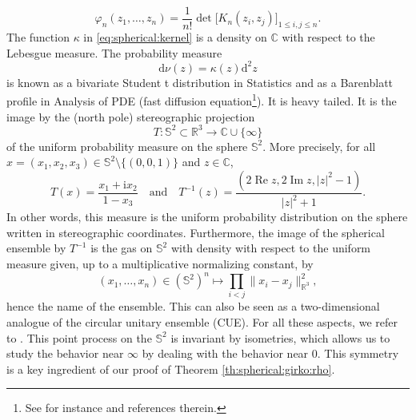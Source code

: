 \documentclass[10pt,reqno]{amsart}
\renewcommand{\Re}{\operatorname{Re}}
\renewcommand{\Im}{\operatorname{Im}}
\newcommand{\dd}{\mathrm{d}}
\newcommand{\<}{\langle}
\renewcommand{\>}{\rangle}
\numberwithin{equation}{section}
\begin{document}
\begin{equation}
\varphi_n(z_1,\ldots,z_n)=\frac{1}{n!}\det\bigr[K_n(z_i,z_j)\bigr]_{1\leq i,j\leq n}.
\end{equation}
The function $\kappa$ in \eqref{eq:spherical:kernel} is a density on $\mathbb{C}$ with respect to the Lebesgue measure. The probability measure 
\begin{equation}
    \dd\nu(z)=\kappa(z)\dd^2z
\end{equation}
is known as a bivariate Student t distribution in Statistics and as a Barenblatt profile in Analysis of PDE (fast diffusion equation\footnote{See for instance \cite{cutfast} and references therein.}). 
It is heavy tailed. It is the image by the (north pole) stereographic projection \begin{equation}
    T:\mathbb{S}^2\subset\mathbb{R}^3\to\mathbb{C}\cup\{\infty\}
\end{equation}
of the uniform probability measure on the sphere $\mathbb{S}^2$. 
More precisely, for all $x=(x_1,x_2,x_3)\in\mathbb{S}^2\setminus\{(0,0,1)\}$ and $z\in\mathbb{C}$,
\begin{equation}\label{eq:T}
    T(x)=\frac{x_1+\mathrm{i}x_2}{1-x_3}
    \quad\text{and}\quad
    T^{-1}(z)%
    =\frac{(2 \Re z, 2 \Im z,|z|^2-1)}{|z|^2+1}.
\end{equation}
In other words, this measure is the uniform probability distribution on the sphere written in stereographic coordinates. Furthermore, the image of the spherical ensemble by $T^{-1}$ is the gas on $\mathbb {S}^2$ with density with respect to the
uniform measure given, up to a multiplicative normalizing constant, by
\begin{equation}\label{eq:spherical:density:sphere}
(x_1,\ldots,x_n)\in(\mathbb{S}^2)^n
\mapsto\prod_{i<j}\|x_i-x_j\|^2_{\mathbb{R}^3},
\end{equation}
hence the name of the ensemble. This can also be seen as a two-dimensional analogue of the circular unitary ensemble (CUE). For all these aspects, we refer to \cite[Sec.~4.3.8]{MR2552864}. This point process on the $\mathbb{S}^2$ is invariant by isometries,
which allows us to study
the behavior near $\infty$ by dealing with
the behavior near $0$. This symmetry is a key ingredient of our proof of Theorem \ref{th:spherical:girko:rho}. 
\end{document}
